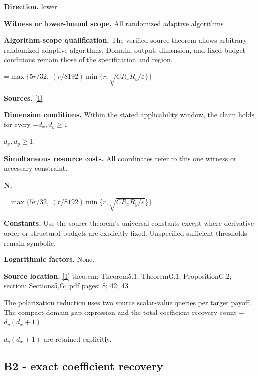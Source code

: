 \documentclass[10pt,a4paper]{article}
\newcommand{\AtlasMath}[1]{\par\begingroup\centering\setbox0=\hbox{$\displaystyle #1$}\ifdim\wd0>1.4\linewidth\typeout{ATLAS WIDE FORMULA: \the\wd0}\fi\ifdim\wd0>\linewidth\resizebox{\linewidth}{!}{\box0}\else\box0\fi\par\endgroup}
\newcommand{\AtlasInlineMath}[1]{\begingroup\setbox0=\hbox{$#1$}\ifdim\wd0>.4\linewidth\endgroup\AtlasMath{#1}\else\endgroup$#1$\fi}
\begin{document}
\textbf{Direction.} lower



\textbf{Witness or lower-bound scope.} All randomized adaptive algorithms



\textbf{Algorithm-scope qualification.} The verified source theorem allows arbitrary randomized adaptive algorithms. Domain, output, dimension, and fixed-budget conditions remain those of the specification and region.



\AtlasMath{\max\{5r/32,\ (r/8192)\min\{r,\sqrt{CR_xR_y/\varepsilon}\}\}}


\textbf{Sources.} \href{https://arxiv.org/pdf/2610.00345v1}{[1]}



\textbf{Dimension conditions.} Within the stated applicability window, the claim holds for every \AtlasInlineMath{d_x,d_y\ge1}.



\textbf{Simultaneous resource costs.} All coordinates refer to this one witness or necessary constraint.



\textbf{N.}



\AtlasMath{\max\{5r/32,\ (r/8192)\min\{r,\sqrt{CR_xR_y/\varepsilon}\}\}}


\textbf{Constants.} Use the source theorem’s universal constants except where derivative order or structural budgets are explicitly fixed. Unspecified sufficient thresholds remain symbolic.



\textbf{Logarithmic factors.} None.



\textbf{Source location.} \href{https://arxiv.org/pdf/2610.00345v1}{[1]} theorem: Theorem5.1; TheoremG.1; PropositionG.2; section: Sections5,G; pdf pages: 8; 42; 43



The polarization reduction uses two source scalar-value queries per target payoff. The compact-domain gap expression and the total coefficient-recovery count \AtlasInlineMath{d_y(d_x+1)} are retained explicitly.



\subsection{B2 - exact coefficient recovery}
\end{document}

